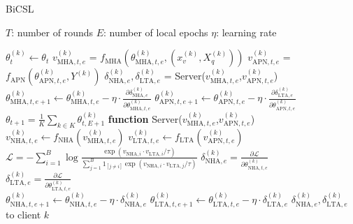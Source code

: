 \documentclass[letterpaper]{article} %
\begin{document}
\begin{algorithm}[!t]
\caption{BiCSL}
\label{BiCSL}
\begin{algorithmic}[1]
\STATE $T$: number of rounds
\STATE $E$: number of local epochs
\STATE $\eta$: learning rate

       \STATE $\theta_{t}^{(k)}\leftarrow \theta_{t}$
       \ENDFOR
            \STATE $v_{\text{MHA},t,e}^{(k)}$ = $f_{\text{MHA}}(\theta_{\text{MHA},t,e}^{(k)},(x_v^{(k)}, X_q^{(k)}))$
            \STATE $v_{\text{APN},t,e}^{(k)}$ = $f_{\text{APN}}(\theta_{\text{APN},t,e}^{(k)},Y^{(k)})$
            \STATE $\delta_{\text{NHA},e}^{(k)},\delta_{\text{LTA},e}^{(k)}$ = Server($v_{\text{MHA},t,e}^{(k)}$,$v_{\text{APN},t,e}^{(k)}$)
            \STATE $\theta_{\text{MHA},t,e+1}^{(k)} \leftarrow \theta_{\text{MHA},t,e}^{(k)}-\eta\cdot \frac{\partial \delta_{\text{NHA},e}^{(k)}}{\partial \theta_{\text{MHA},t,e}^{(k)}}$
            \STATE $\theta_{\text{APN},t,e+1}^{(k)} \leftarrow \theta_{\text{APN},t,e}^{(k)}-\eta\cdot \frac{\partial \delta_{\text{LTA},e}^{(k)}}{\partial \theta_{\text{APN},t,e}^{(k)}}$\
        \ENDFOR
   \ENDFOR
   \STATE $\theta_{t+1} = \frac{1}{K}\sum_{k\in K}\theta_{t,E+1}^{(k)}$
   \ENDFOR
\ENDFOR
\STATE
\STATE \textbf{function} Server($v_{\text{MHA},t,e}^{(k)}$,$v_{\text{APN},t,e}^{(k)}$)
\STATE $v_{\text{NHA},t,e}^{(k)} \leftarrow f_{\text{NHA}}(v_{\text{MHA},t,e}^{(k)})$
\STATE $v_{\text{LTA},t,e}^{(k)} \leftarrow f_{\text{LTA}}(v_{\text{APN},t,e}^{(k)})$
\STATE $\mathcal{L}= -\sum_{i=1}^{B}\log\frac{\exp(v_{\text{NHA},i} \cdot v_{\text{LTA},i} / \tau)}{\sum_{j=1}^{B} {1}_{[j \neq i]} \exp(v_{\text{NHA},i} \cdot v_{\text{LTA},j} / \tau)}$
\STATE $\delta_{\text{NHA},e}^{(k)}=\frac{\partial\mathcal{L}}{\partial \theta_{\text{NHA},t,e}^{(k)}}$\\
\STATE $\delta_{\text{LTA},e}^{(k)}=\frac{\partial\mathcal{L}}{\partial \theta_{\text{LTA},t,e}^{(k)}}$\\
\STATE $\theta_{\text{NHA},t,e+1}^{(k)}\leftarrow \theta_{\text{NHA},t,e}^{(k)}-\eta\cdot \delta_{\text{NHA},e}^{(k)}$
\STATE $\theta_{\text{LTA},t,e+1}^{(k)}\leftarrow \theta_{\text{LTA},t,e}^{(k)}-\eta\cdot \delta_{\text{LTA},e}^{(k)}$
\RETURN $\delta_{\text{NHA},e}^{(k)},\delta_{\text{LTA},e}^{(k)}$ to client $k$
\end{algorithmic}
\end{algorithm}
\end{document}
